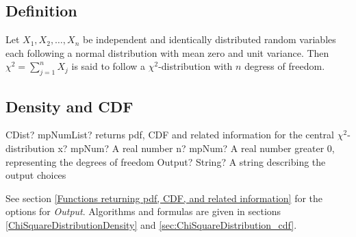 \subsection{Definition}
\label{ChiSquareDistributionDefinition}

Let $X_1, X_2, \ldots, X_n$ be independent and identically distributed random variables each following a normal distribution with mean zero and unit variance. Then $\chi^2 = \sum_{j=1}^n X_j$ is said to follow a $\chi^2$-distribution with $n$ degress of freedom. 


\subsection{Density and CDF}

\begin{mpFunctionsExtract}
	\mpFunctionThree
	{CDist? mpNumList? returns pdf, CDF and related information for the central $\chi^2$-distribution}
	{x? mpNum? A real number}
	{n? mpNum? A real number greater 0, representing the degrees of freedom}
	{Output? String? A string describing the output choices}
\end{mpFunctionsExtract}


\vspace{0.3cm}
See section \ref{Functions returning pdf, CDF, and related information} for the options for {\itshape\sffamily Output}. Algorithms and formulas are given in sections \ref{ChiSquareDistributionDensity} and \ref{sec:ChiSquareDistribution_cdf}.



%
%



